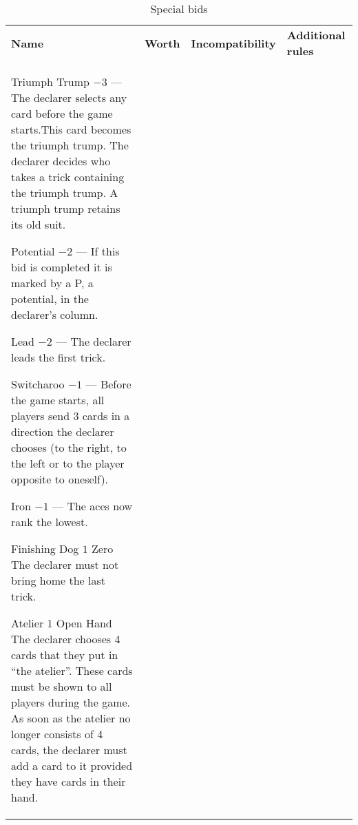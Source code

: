 %
%
%

\newcommand{\nonTrump}{\textnormal{non-trump bids}}

\begin{table}
	\caption{Special bids}\label{tab:specialBids}
	\begin{center}
		\begin{tabularx}{\textwidth}{lcp{3cm}|X}
			\textbf{Name} &
			\textbf{Worth} &
			\textbf{Incompatibility} &
			\textbf{Additional rules}
			\\[-3ex]

			\specialBidItem%
			{Triumph Trump}
			{$-3$}
			{---}
			{%
				The declarer selects any card before the game starts.This card becomes the triumph trump. The declarer decides who takes a trick containing the triumph trump. A triumph trump retains its old suit.
			}

			\specialBidItem%
			{Potential}
			{$-2$}
			{---}
			{%
				If this bid is completed it is marked by a P, a potential, in the declarer's column.
			}

			\specialBidItem%
			{Lead}
			{$-2$}
			{---}
			{%
				The declarer leads the first trick.
			}

			\specialBidItem%
			{Switcharoo}
			{$-1$}
			{---}
			{%
				Before the game starts, all players send 3 cards in a direction the declarer chooses (to the right, to the left or to the player opposite to oneself).
			}

			\specialBidItem%
			{Iron}
			{$-1$}
			{---}
			{%
				The aces now rank the lowest.
			}

			\specialBidItem%
			{Finishing Dog}
			{$1$}
			{Zero}
			{%
				The declarer must not bring home the last trick. 
			}

			\specialBidItem%
			{Atelier}
			{$1$}
			{Open Hand}
			{%
				The declarer chooses 4 cards that they put in ``the atelier''. These cards must be shown to all players during the game. As soon as the atelier no longer consists of 4 cards, the declarer must add a card to it provided they have cards in their hand.
			}


\end{tabularx}
\end{center}
\end{table}
